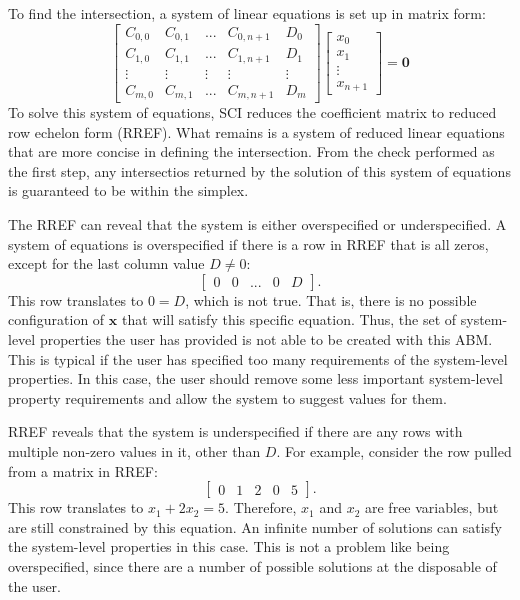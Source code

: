 To find the intersection, a system of linear equations is set up in matrix form:
\[  \left[ \begin{array}{ccccc}
C_{0,0} & C_{0, 1} & ... & C_{0,n+1} & D_0 \\
C_{1,0} & C_{1, 1} & ... & C_{1,n+1} & D_1 \\
\vdots  & \vdots   & \vdots & \vdots & \vdots \\
C_{m,0} & C_{m, 1} & ... & C_{m, n+1} & D_m \end{array} \right]
\left[ \begin{array}{c}
x_0 \\
x_1 \\
\vdots \\
x_{n+1} \end{array} \right] = \mathbf 0
\] 
To solve this system of equations, SCI reduces the coefficient matrix to reduced row echelon form (RREF).
What remains is a system of reduced linear equations that are more concise in defining the intersection.
From the check performed as the first step, any intersectios returned by the solution of this system of equations is guaranteed to be within the simplex.


The RREF can reveal that the system is either overspecified or underspecified.
A system of equations is overspecified if there is a row in RREF that is all zeros, except for the last column value $D \neq 0$:
\[ \left[ \begin{array}{ccccc} 0 & 0 & ... & 0 & D \end{array} \right]. \]
This row translates to $0 = D$, which is not true.
That is, there is no possible configuration of $\mathbf x$ that will satisfy this specific equation.
Thus, the set of system-level properties the user has provided is not able to be created with this ABM.
This is typical if the user has specified too many requirements of the system-level properties.
In this case, the user should remove some less important system-level property requirements and allow the system to suggest values for them.

RREF reveals that the system is underspecified if there are any rows with multiple non-zero values in it, other than $D$. For example, consider the row pulled from a matrix in RREF:
\[ \left[ \begin{array}{ccccc} 0 & 1 & 2 & 0 & 5 \end{array} \right]. \]
This row translates to $x_1 + 2x_2 = 5$.
Therefore, $x_1$ and $x_2$ are free variables, but are still constrained by this equation.
An infinite number of solutions can satisfy the system-level properties in this case.
This is not a problem like being overspecified, since there are a number of possible solutions at the disposable of the user.



